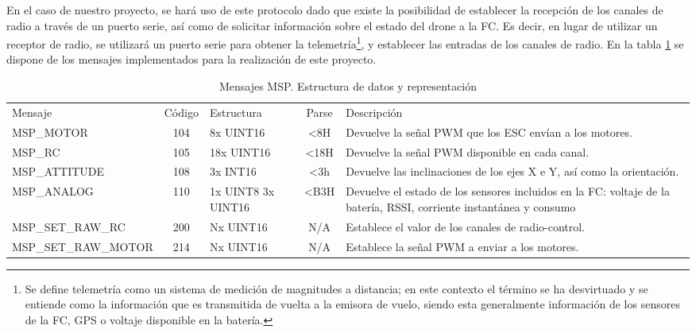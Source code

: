 En el caso de nuestro proyecto, se hará uso de este protocolo dado que existe la posibilidad de establecer la recepción de los canales de radio a través de un puerto serie, así como de solicitar información sobre el estado del drone a la FC. Es decir, en lugar de utilizar un receptor de radio, se utilizará un puerto serie para obtener la telemetría\footnote{Se define telemetría como un sistema de medición de magnitudes a distancia; en este contexto el término se ha desvirtuado y se entiende como la información que es transmitida de vuelta a la emisora de vuelo, siendo esta generalmente información de los sensores de la FC, GPS o voltaje disponible en la batería.}, y establecer las entradas de los canales de radio. 
En la tabla \ref{tb:MSP_MESSAGES} se dispone de los mensajes implementados para la realización de este proyecto. 


\begin{table}
	\begin{center}	
		\begin{tabular}{m{4.6cm} | c | m{2cm} | c | m{5cm}}\hline
			\toprule
			Mensaje & Código & Estructura & Parse & Descripción\\
			\otoprule
			MSP\_MOTOR & 104 & 8x UINT16 & <8H & Devuelve la señal PWM que los ESC envían a los motores.\\
			MSP\_RC & 105 & 18x UINT16 & <18H & Devuelve la señal PWM disponible en cada canal.\\
			MSP\_ATTITUDE & 108  & 3x INT16 & <3h & Devuelve las inclinaciones de los ejes X e Y, así como la orientación.\\
			MSP\_ANALOG & 110 & 1x UINT8 3x UINT16 & <B3H & Devuelve el estado de los sensores incluidos en la FC: voltaje de la batería, RSSI, corriente instantánea y consumo\\
			MSP\_SET\_RAW\_RC & 200 & Nx UINT16 & N/A & Establece el valor de los canales de radio-control.\\
			MSP\_SET\_RAW\_MOTOR & 214 & Nx UINT16 & N/A & Establece la señal PWM a enviar a los motores.\\
			\bottomrule
		\end{tabular}
		\caption{Mensajes MSP. Estructura de datos y representación}
		\label{tb:MSP_MESSAGES}
	\end{center}
\end{table} 

